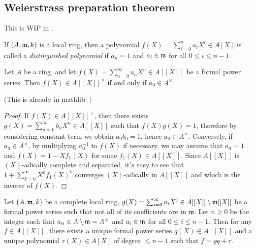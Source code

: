 \subsection{Weierstrass preparation theorem}

This is WIP in .

\begin{definition}
\label{distinguished-polynomial}
If $(A,{\mathfrak{m}},k)$ is a local ring, then a polynomial $f(X)=\sum_{i=0}^na_iX^i\in A[X]$
is called a \emph{distinguished polynomial}
if $a_n=1$ and $a_i\in{\mathfrak{m}}$ for all $0\leq i\leq n-1$.
\end{definition}

\begin{prop}
\label{power-series-invertible-iff}
\leanok
Let $A$ be a ring, and let $f(X)=\sum_{n=0}^\infty a_nX^n\in A[[X]]$
be a formal power series.
Then $f(X)\in A[[X]]^\times$ if and only if $a_0\in A^\times$.

(This is already in mathlib: )
\end{prop}

\begin{proof}
\leanok
If $f(X)\in A[[X]]^\times$,
then there exists $g(X)=\sum_{n=0}^\infty b_nX^n\in A[[X]]$
such that $f(X)g(X)=1$, therefore by considering constant term we obtain
$a_0b_0=1$, hence $a_0\in A^\times$.
Conversely, if $a_0\in A^\times$, by multiplying $a_0^{-1}$ to $f(X)$
if necessary, we may assume that $a_0=1$
and $f(X)=1-Xf_1(X)$ for some $f_1(X)\in A[[X]]$.
Since $A[[X]]$ is $(X)$-adically complete and separated,
it's easy to see that $1+\sum_{k=0}^\infty X^kf_1(X)^k$
converges $(X)$-adically in $A[[X]]$ and which is the inverse of
$f(X)$.
\end{proof}

\begin{prop}
\label{weierstrass-division}
Let $(A,{\mathfrak{m}},k)$ be a complete local ring,
$g(X)=\sum_{i=0}^\infty a_iX^i\in A[[X]]\setminus{\mathfrak{m}}[[X]]$ be a formal power series
such that not all of its coefficients are in ${\mathfrak{m}}$.
Let $n\geq 0$ be the integer such that $a_n\in A\setminus{\mathfrak{m}}=A^\times$
and $a_i\in{\mathfrak{m}}$ for all $0\leq i\leq n-1$.
Then for any $f\in A[[X]]$,
there exists a unique formal power series
$q(X)\in A[[X]]$ and a unique polynomial $r(X)\in A[X]$ of degree $\leq n-1$
such that $f=gq+r$.
\end{prop}


